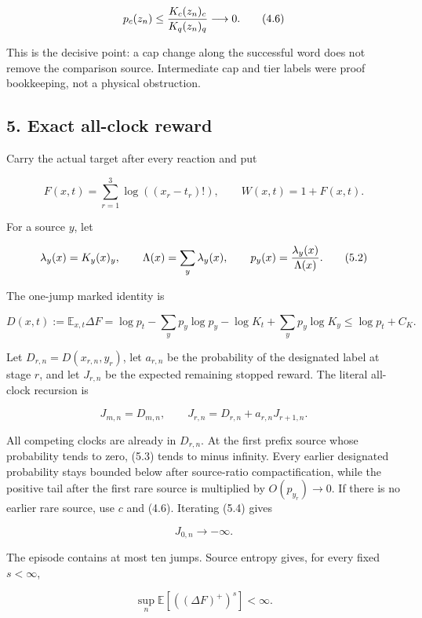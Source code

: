 \[
 p_c(z_n)\le {K_c(z_n)_c\over K_q(z_n)_q}
                         \longrightarrow0.            \tag{4.6}
\]

This is the decisive point: a cap change along the successful word does
not remove the comparison source. Intermediate cap and tier labels were
proof bookkeeping, not a physical obstruction.

\subsection{5. Exact all-clock reward}

Carry the actual target after every reaction and put

\[
 F(x,t)=\sum_{r=1}^3\log((x_r-t_r)!),
 \qquad W(x,t)=1+F(x,t).                              \tag{5.1}
\]

For a source \(y\), let

\[
 \lambda_y(x)=K_y(x)_y,\qquad
 \Lambda(x)=\sum_y\lambda_y(x),\qquad
 p_y(x)={\lambda_y(x)\over\Lambda(x)}.               \tag{5.2}
\]

The one-jump marked identity is

\[
 D(x,t):=\mathbb E_{x,t}\Delta F
   =\log p_t-\sum_yp_y\log p_y-\log K_t
                         +\sum_yp_y\log K_y
   \le\log p_t+C_K.                                  \tag{5.3}
\]

Let \(D_{r,n}=D(x_{r,n},y_r)\), let \(a_{r,n}\) be the probability of
the designated label at stage \(r\), and let \(J_{r,n}\) be the expected
remaining stopped reward. The literal all-clock recursion is

\[
                 J_{m,n}=D_{m,n},\qquad
                 J_{r,n}=D_{r,n}+a_{r,n}J_{r+1,n}.    \tag{5.4}
\]

All competing clocks are already in \(D_{r,n}\). At the first prefix
source whose probability tends to zero, (5.3) tends to minus infinity.
Every earlier designated probability stays bounded below after
source-ratio compactification, while the positive tail after the first
rare source is multiplied by \(O(p_{y_r})\to0\). If there is no earlier
rare source, use \(c\) and (4.6). Iterating (5.4) gives

\[
                              J_{0,n}\longrightarrow-\infty.         \tag{5.5}
\]

The episode contains at most ten jumps. Source entropy gives, for every
fixed \(s<\infty\),

\[
                  \sup_n\mathbb E[((\Delta F)^+)^s]<\infty.         \tag{5.6}
\]

